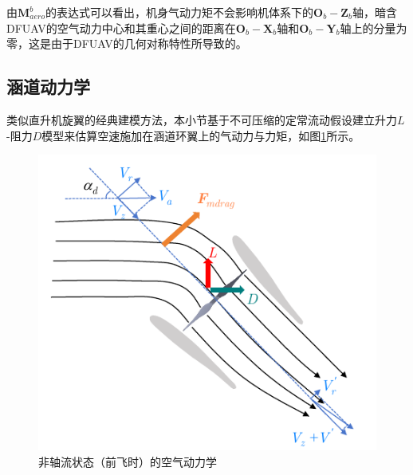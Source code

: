 由$\boldsymbol{M}_{aero}^b$的表达式可以看出，机身气动力矩不会影响机体系下的${\boldsymbol{O}_b}-{\boldsymbol{Z}_b}$轴，暗含DFUAV的空气动力中心和其重心之间的距离在${\boldsymbol{O}_b}-{\boldsymbol{X}_b}$轴和${\boldsymbol{O}_b}-{\boldsymbol{Y}_b}$轴上的分量为零，这是由于DFUAV的几何对称特性所导致的。

\subsection{涵道动力学}

类似直升机旋翼的经典建模方法，本小节基于不可压缩的定常流动假设建立升力$L$-阻力$D$模型来估算空速施加在涵道环翼上的气动力与力矩\cite{johnsonModelingControlFlight2006b}，如图\ref{非轴流状态}所示。

\begin{figure}[htbp]
	\centering
	\begin{minipage}[c]{1\textwidth}
		\centering
		\includegraphics[scale=1]{Fig/非轴流状态.pdf}
		\caption{\label{非轴流状态}非轴流状态（前飞时）的空气动力学}
	\end{minipage}%
\end{figure}

